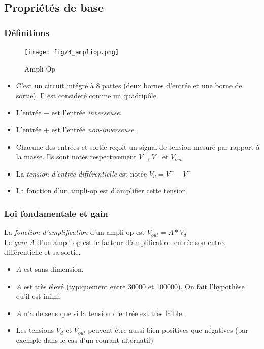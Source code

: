 \documentclass[a4paper]{article}
\begin{document}
    \subsection{Propriétés de base}
        \subsubsection{Définitions}
            \begin{figure}[H]
                \begin{center}
                    \texttt{[image: fig/4\_ampliop.png]}
                    \caption{Ampli Op}
                \end{center}
            \end{figure}
            \begin{itemize} 
            \item C'est un circuit intégré à 8 pattes (deux bornes d'entrée et une borne de sortie). Il est considéré comme un quadripôle.
            \item L'entrée $-$ est l'entrée \textit{inverseuse}.
            \item L'entrée $+$ est l'entrée \textit{non-inverseuse}.
            \item Chacune des entrées et sortie reçoit un signal de tension mesuré par rapport à la masse. Ils sont notés respectivement $ V^{+} $, $ V^{-} $ et $ V_{out} $
            \item La \textit{tension d'entrée différentielle} est notée $ V_{d} = V^{+} - V^{-} $
            \item La fonction d'un ampli-op est d'amplifier cette tension
            \end{itemize}
        \subsubsection{Loi fondamentale et gain}
        La \textit{fonction d'amplification} d'un ampli-op est $ V_{out} = A*V_{d} $ \\
        Le \textit{gain} $A$ d'un ampli op est le facteur d'amplification entrée son entrée différentielle et sa sortie. \\
        \begin{itemize}
            \item $A$ est sans dimension.
            \item $A$ est très élevé (typiquement entre 30000 et 100000). On fait l'hypothèse qu'il est infini.
            \item $A$ n'a de sens que si la tension d'entrée est très faible.
            \item Les tensions $V_{d}$ et $V_{out}$ peuvent être aussi bien positives que négatives (par exemple dans le cas d'un courant alternatif)
        \end{itemize}
\end{document}
